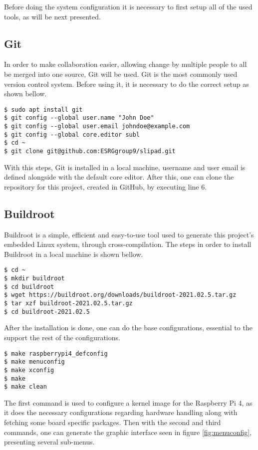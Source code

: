 Before doing the system configuration it is necessary to first setup all of the used tools, as will be next presented.

\subsection{Git}
In order to make collaboration easier, allowing change by multiple people to all be merged into one source, Git will be used. Git is the most commonly used version control system. Before using it, it is necessary to do the correct setup as shown bellow.
\begin{lstlisting}
$ sudo apt install git
$ git config --global user.name "John Doe"
$ git config --global user.email johndoe@example.com
$ git config --global core.editor subl
$ cd ~
$ git clone git@github.com:ESRGgroup9/slipad.git
\end{lstlisting}

With this steps, Git is installed in a local machine, username and user email is defined alongside with the default core editor. After this, one can clone the repository for this project, created in GitHub, by executing line 6.

\subsection{Buildroot}
Buildroot is a simple, efficient and easy-to-use tool used to generate this project's embedded Linux system, through cross-compilation. The steps in order to install Buildroot in a local machine is shown bellow.

\begin{lstlisting}
$ cd ~
$ mkdir buildroot
$ cd buildroot
$ wget https://buildroot.org/downloads/buildroot-2021.02.5.tar.gz
$ tar xzf buildroot-2021.02.5.tar.gz
$ cd buildroot-2021.02.5
\end{lstlisting}

After the installation is done, one can do the base configurations, essential to the support the rest of the configurations.
\begin{lstlisting}
$ make raspberrypi4_defconfig
$ make menuconfig
$ make xconfig
$ make 
$ make clean
\end{lstlisting}

The first command is used to configure a kernel image for the Raspberry Pi 4, as it does the necessary configurations regarding hardware handling along with fetching some board specific packages. Then with the second and third commands, one can generate the graphic interface seen in figure \ref{fig:menuconfig}, presenting several sub-menus. 

